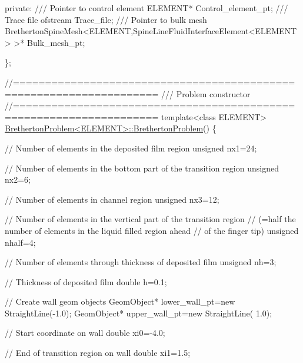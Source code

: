 \begin{DoxyCodeInclude}
\textcolor{keyword}{private}:
\textcolor{comment}{}
\textcolor{comment}{ /// Pointer to control element}
\textcolor{comment}{} ELEMENT* Control\_element\_pt;
\textcolor{comment}{}
\textcolor{comment}{ /// Trace file}
\textcolor{comment}{} ofstream Trace\_file;
\textcolor{comment}{}
\textcolor{comment}{ /// Pointer to bulk mesh}
\textcolor{comment}{} BrethertonSpineMesh<ELEMENT,SpineLineFluidInterfaceElement<ELEMENT> >* 
 Bulk\_mesh\_pt;

\};


\textcolor{comment}{//====================================================================}\textcolor{comment}{}
\textcolor{comment}{/// Problem constructor}
\textcolor{comment}{}\textcolor{comment}{//====================================================================}
\textcolor{keyword}{template}<\textcolor{keyword}{class} ELEMENT>
\hyperlink{classBrethertonProblem_a207cdfe4cf60e83257e759b1ac15e5eb}{BrethertonProblem<ELEMENT>::BrethertonProblem}()
\{

 \textcolor{comment}{// Number of elements in the deposited film region}
 \textcolor{keywordtype}{unsigned} nx1=24;

 \textcolor{comment}{// Number of elements in the bottom part of the transition region}
 \textcolor{keywordtype}{unsigned} nx2=6;

 \textcolor{comment}{// Number of elements in channel region}
 \textcolor{keywordtype}{unsigned} nx3=12;

 \textcolor{comment}{// Number of elements in the vertical part of the transition region}
 \textcolor{comment}{// (=half the number of elements in the liquid filled region ahead}
 \textcolor{comment}{// of the finger tip)}
 \textcolor{keywordtype}{unsigned} nhalf=4;

 \textcolor{comment}{// Number of elements through thickness of deposited film}
 \textcolor{keywordtype}{unsigned} nh=3;
 
 \textcolor{comment}{// Thickness of deposited film}
 \textcolor{keywordtype}{double} h=0.1;

 \textcolor{comment}{// Create wall geom objects}
 GeomObject* lower\_wall\_pt=\textcolor{keyword}{new} StraightLine(-1.0);
 GeomObject* upper\_wall\_pt=\textcolor{keyword}{new} StraightLine( 1.0);

 \textcolor{comment}{// Start coordinate on wall}
 \textcolor{keywordtype}{double} xi0=-4.0;

 \textcolor{comment}{// End of transition region on wall}
 \textcolor{keywordtype}{double} xi1=1.5;


\end{DoxyCodeInclude}
